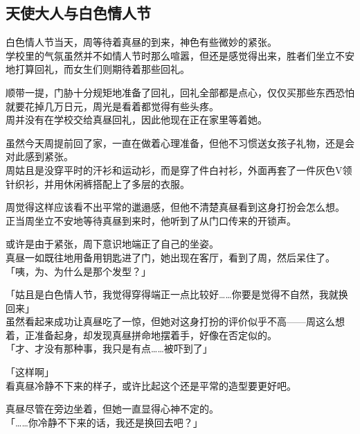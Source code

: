\subsection{天使大人与白色情人节}

白色情人节当天，周等待着真昼的到来，神色有些微妙的紧张。\\

学校里的气氛虽然并不如情人节时那么喧嚣，但还是感觉得出来，胜者们坐立不安地打算回礼，而女生们则期待着那些回礼。

顺带一提，门胁十分规矩地准备了回礼，回礼全部都是点心，仅仅买那些东西恐怕就要花掉几万日元，周光是看着都觉得有些头疼。\\

周并没有在学校交给真昼回礼，因此他现在正在家里等着她。

虽然今天周提前回了家，一直在做着心理准备，但他不习惯送女孩子礼物，还是会对此感到紧张。\\

周姑且是没穿平时的汗衫和运动衫，而是穿了件白衬衫，外面再套了一件灰色V领针织衫，并用休闲裤搭配上了多层的衣服。

周觉得这样应该看不出平常的邋遢感，但他不清楚真昼看到这身打扮会怎么想。\\

正当周坐立不安地等待真昼到来时，他听到了从门口传来的开锁声。

或许是由于紧张，周下意识地端正了自己的坐姿。\\

真昼一如既往地用备用钥匙进了门，她出现在客厅，看到了周，然后呆住了。\\

「咦，为、为什么是那个发型？」

「姑且是白色情人节，我觉得穿得端正一点比较好……你要是觉得不自然，我就换回来」\\

虽然看起来成功让真昼吃了一惊，但她对这身打扮的评价似乎不高——周这么想着，正准备起身，却发现真昼拼命地摆着手，好像在否定似的。\\

「才、才没有那种事，我只是有点……被吓到了」

「这样啊」\\

看真昼冷静不下来的样子，或许比起这个还是平常的造型要更好吧。

真昼尽管在旁边坐着，但她一直显得心神不定的。\\

「……你冷静不下来的话，我还是换回去吧？」

